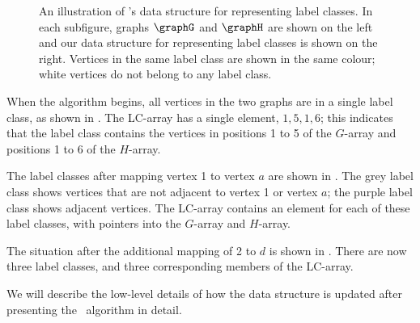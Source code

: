 \begin{figure}[htb]
{   
        \label{subfig:data-structure-c}
    }
\caption{An illustration of \McSplit's data structure for representing label classes. In each subfigure,
graphs $\graphG$ and $\graphH$ are shown on the left and our data structure for representing label classes
is shown on the right. Vertices in the same label class are shown in the same colour; white vertices
do not belong to any label class.}
\label{fig:data-structure}
\end{figure}

When the algorithm begins, all vertices in the two graphs are in a single label class, as
shown in .  The LC-array has a single element, $1,5,1,6$; this indicates
that the label class contains the vertices in positions 1 to 5 of the $G$-array and positions 1 to 6
of the $H$-array.

The label classes after mapping vertex 1 to vertex $a$ are shown in .
The grey label class shows vertices that are not adjacent to vertex 1 or vertex $a$; the purple
label class shows adjacent vertices.  The LC-array contains an element for each of these label
classes, with pointers into the $G$-array and $H$-array.

The situation after the additional mapping of 2 to $d$ is shown in .
There are now three label classes, and three corresponding members of the LC-array.

We will describe the low-level details of how the data structure is updated
after presenting the \McSplit\ algorithm in detail.

